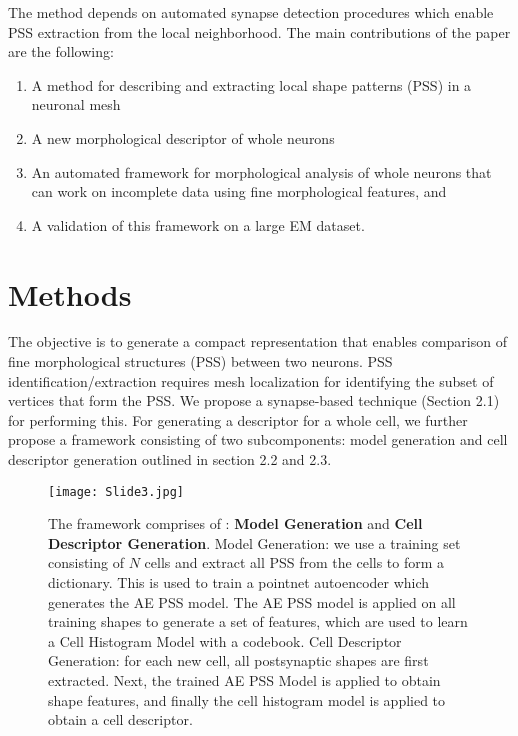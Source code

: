 \documentclass[runningheads]{llncs}
\begin{document}
The method depends on automated synapse detection procedures \cite{synapsedetection} which enable PSS extraction from the local neighborhood. The main contributions of the paper are the following:
\begin{enumerate}
\item A method for describing and extracting local shape patterns (PSS) in a neuronal mesh
\item A new morphological descriptor of whole neurons
\item An automated framework for morphological analysis of whole neurons that can work on incomplete data using fine morphological features, and 
\item A validation of this framework on a large EM dataset.
\end{enumerate}
\section{Methods}
The objective is to generate a compact representation that enables comparison of fine morphological structures (PSS) between two neurons. PSS identification/extraction requires mesh localization for identifying the subset of vertices that form the PSS. We propose a synapse-based technique (Section 2.1) for performing this. For generating a descriptor for a whole cell, we further propose a framework consisting of two subcomponents: model generation and cell descriptor generation outlined in section 2.2 and 2.3. 
\begin{figure}[t]
    \centering
    \texttt{[image: Slide3.jpg]}
    \caption{The framework comprises of : \textbf{Model Generation} and \textbf{Cell Descriptor Generation}.
Model Generation: we use a training set consisting of $N$ cells and extract all PSS from the cells to form a dictionary.
This is used to train a pointnet autoencoder which generates the AE PSS model.
The AE PSS model is applied on all training shapes to generate a set of features, which are used to learn a Cell Histogram Model with a codebook.
Cell Descriptor Generation: for each new cell, all postsynaptic shapes are first extracted.
Next, the trained AE PSS Model is applied to obtain shape features, and finally the cell histogram model is applied to obtain a cell descriptor. }
    \label{fig:workflowimage}
    
\end{figure}
\end{document}
